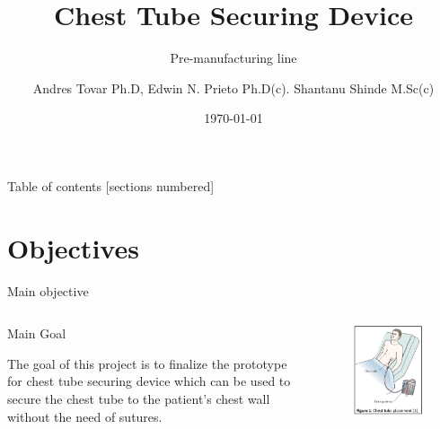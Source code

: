 \documentclass[10pt]{beamer} %
\title{Chest Tube Securing Device}
\subtitle{Pre-manufacturing line}
\date{\today}
\date{}
\author{Andres Tovar Ph.D, Edwin N. Prieto Ph.D(c). Shantanu Shinde M.Sc(c)}
\institute{\textbf{Indiana University-Purdue University Indianapolis}}
\begin{document}
\maketitle
%


\begin{frame}{Table of contents}
  [sections numbered]
  \tableofcontents[]
\end{frame}

\section{Objectives}

\begin{frame}[fragile]{Main objective}
\begin{columns}[T,onlytextwidth]
\vspace{13mm}
\begin{alertblock}{Main Goal}

The goal of this project is to finalize the prototype for chest tube securing device which can be used to secure the chest tube to the patient’s chest wall without the need of sutures. 

\end{alertblock}
\begin{figure}
\includegraphics[scale=0.5]{State-art.png}
\end{figure}
\end{columns}
\end{frame}
\end{document}
